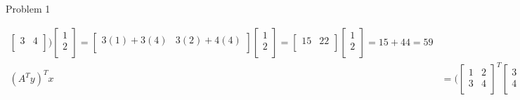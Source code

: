 \begin{problem}{Problem 1}
\begin{highlight}[Solution]
\begin{align*}
\begin{bmatrix}
                    3 & 4 \\
                \end{bmatrix}
            \Biggr)
            \begin{bmatrix}
                1 \\
                2 \\
            \end{bmatrix}
            = 
            \begin{bmatrix}
                3(1) + 3(4) & 3(2) + 4(4) \\
            \end{bmatrix}
            \begin{bmatrix}
                1 \\
                2 \\
            \end{bmatrix}
            =
            \begin{bmatrix}
                15 & 22 \\
            \end{bmatrix}
            \begin{bmatrix}
                1 \\
                2 \\
            \end{bmatrix}
            = 15 + 44 = 59 \\
            (A^{T}y)^{T}x & = 
            \Biggl(
                \begin{bmatrix}
                    1 & 2 \\
                    3 & 4 \\
                \end{bmatrix}^{T}
                \begin{bmatrix}
                    3 \\
                    4 \\
                \end{bmatrix}
            \Biggr)^{T}
            \begin{bmatrix}
                1 \\
                2 \\
            \end{bmatrix}
            = 
            \Biggl(
                \begin{bmatrix}
                    1 & 3 \\
                    2 & 4 \\
                \end{bmatrix}

\end{align*}
\end{highlight}
\end{problem}
